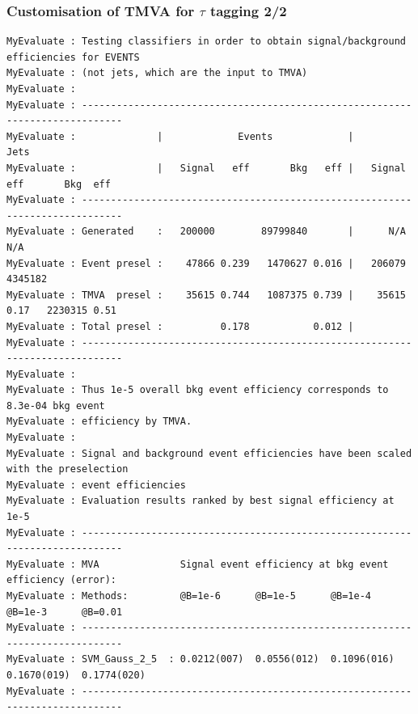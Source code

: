 \begin{frame}[fragile]
\frametitle{Customisation of TMVA for $\tau$ tagging 2/2}
\scriptsize
\begin{verbatim}
MyEvaluate : Testing classifiers in order to obtain signal/background efficiencies for EVENTS
MyEvaluate : (not jets, which are the input to TMVA)
MyEvaluate :
MyEvaluate : -----------------------------------------------------------------------------
MyEvaluate :              |             Events             |               Jets
MyEvaluate :              |   Signal   eff       Bkg   eff |   Signal  eff       Bkg  eff
MyEvaluate : -----------------------------------------------------------------------------
MyEvaluate : Generated    :   200000        89799840       |      N/A            N/A
MyEvaluate : Event presel :    47866 0.239   1470627 0.016 |   206079        4345182
MyEvaluate : TMVA  presel :    35615 0.744   1087375 0.739 |    35615 0.17   2230315 0.51
MyEvaluate : Total presel :          0.178           0.012 |
MyEvaluate : -----------------------------------------------------------------------------
MyEvaluate :
MyEvaluate : Thus 1e-5 overall bkg event efficiency corresponds to 8.3e-04 bkg event
MyEvaluate : efficiency by TMVA.
MyEvaluate :
MyEvaluate : Signal and background event efficiencies have been scaled with the preselection
MyEvaluate : event efficiencies
MyEvaluate : Evaluation results ranked by best signal efficiency at 1e-5
MyEvaluate : -----------------------------------------------------------------------------
MyEvaluate : MVA              Signal event efficiency at bkg event efficiency (error):
MyEvaluate : Methods:         @B=1e-6      @B=1e-5      @B=1e-4      @B=1e-3      @B=0.01
MyEvaluate : -----------------------------------------------------------------------------
MyEvaluate : SVM_Gauss_2_5  : 0.0212(007)  0.0556(012)  0.1096(016)  0.1670(019)  0.1774(020)
MyEvaluate : -----------------------------------------------------------------------------
\end{verbatim}
\normalsize
\end{frame}

